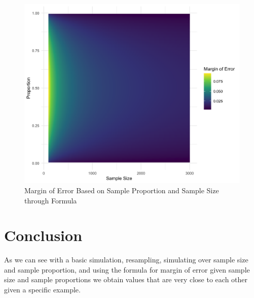 \documentclass{article}\usepackage[]{graphicx}\usepackage[]{xcolor}
\begin{document}
\begin{multicols}{2}
\begin{figure}[H]
\begin{center}
\includegraphics[scale=0.14]{fifth.png}
\caption{Margin of Error Based on Sample Proportion and Sample Size through Formula}
\label{Figure 5}
\end{center}
\end{figure}

\section{Conclusion}
As we can see with a basic simulation, resampling, simulating over sample size and sample proportion, and using the formula for margin of error given sample size and sample proportions we obtain values that are very close to each other given a specific example. 




\vspace{2em}


\begin{tiny}

\end{tiny}
\end{multicols}
\end{document}
